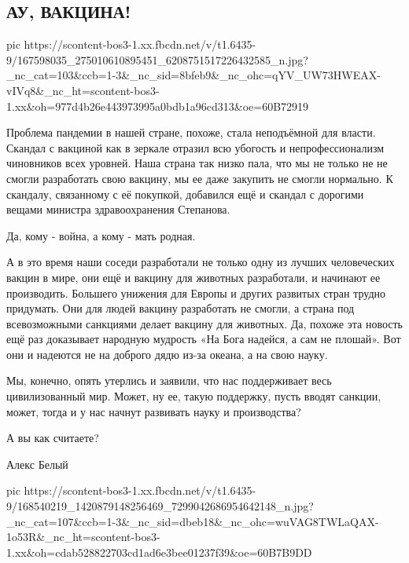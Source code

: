  
 
 
 
 
\subsection{АУ, ВАКЦИНА!}
\label{sec:01_04_2021.fb.belyj_aleks.1.vaccina}

\ifcmt
  pic https://scontent-bos3-1.xx.fbcdn.net/v/t1.6435-9/167598035_275010610895451_6208751517226432585_n.jpg?_nc_cat=103&ccb=1-3&_nc_sid=8bfeb9&_nc_ohc=qYV_UW73HWEAX-vIVq8&_nc_ht=scontent-bos3-1.xx&oh=977d4b26e443973995a0bdb1a96cd313&oe=60B72919
\fi

Проблема пандемии в нашей стране, похоже, стала неподъёмной для власти. Скандал
с вакциной как в зеркале отразил всю убогость и непрофессионализм чиновников
всех уровней. Наша страна так низко пала, что мы не только не не смогли
разработать свою вакцину, мы ее даже закупить не смогли нормально. К скандалу,
связанному с её покупкой, добавился ещё и скандал с дорогими вещами министра
здравоохранения Степанова. 

Да, кому - война, а кому - мать родная. 

А в это время наши соседи разработали не только одну из лучших человеческих
вакцин в мире, они ещё и вакцину для животных разработали, и начинают ее
производить. Большего унижения для Европы и других развитых стран трудно
придумать. Они для людей вакцину разработать не смогли, а страна под
всевозможными санкциями делает вакцину для животных.   Да, похоже эта новость
ещё раз доказывает народную мудрость «На Бога надейся, а сам не плошай». Вот
они и надеются не на доброго дядю из-за океана, а на свою науку. 

Мы, конечно, опять утерлись и заявили, что нас поддерживает весь цивилизованный
мир. Может, ну ее, такую поддержку, пусть вводят санкции, может,  тогда и у нас
начнут развивать науку и производства?

А вы как считаете?

Алекс Белый


\ifcmt
  pic https://scontent-bos3-1.xx.fbcdn.net/v/t1.6435-9/168540219_1420879148256469_7299042686954642148_n.jpg?_nc_cat=107&ccb=1-3&_nc_sid=dbeb18&_nc_ohc=wuVAG8TWLaQAX-1o53R&_nc_ht=scontent-bos3-1.xx&oh=cdab528822703cd1ad6e3bee01237f39&oe=60B7B9DD
\fi

